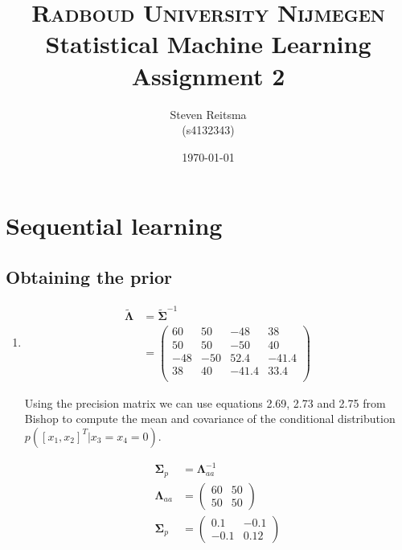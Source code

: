 \documentclass[paper=a4, fontsize=10pt]{scrartcl} %
\title{	
\normalfont \normalsize 
\textsc{Radboud University Nijmegen}  %
\horrule{0.5pt} \\[0.3cm] %
\huge Statistical Machine Learning \\ Assignment 2 \\ %
\horrule{2pt}  %
}
\author{Steven Reitsma \\ (s4132343)} %
\date{\normalsize\today} %
\numberwithin{equation}{section} %
\numberwithin{figure}{section} %
\numberwithin{table}{section} %
\begin{document}
\maketitle %

\section{Sequential learning}
\subsection{Obtaining the prior}
\begin{enumerate}
	\item 
		\begin{align}
			\boldsymbol{\tilde \Lambda} &= \boldsymbol{\tilde \Sigma}^{-1}\\
						   &= \begin{pmatrix}
								   60 &  50 & -48 &  38\\
								   50 &  50 & -50 &  40\\
								  -48 & -50 &  52.4 & -41.4\\
								   38 &  40 & -41.4 &  33.4\\
							  \end{pmatrix}
		\end{align}

		Using the precision matrix we can use equations 2.69, 2.73 and 2.75 from Bishop to compute the mean and covariance of the conditional distribution $p([x_1, x_2]^T \vert x_3 = x_4 = 0)$.

		\begin{align}
			\boldsymbol\Sigma_p &= \boldsymbol\Lambda_{aa}^{-1} \tag{according to 2.73}\\
			\boldsymbol\Lambda_{aa} &= \begin{pmatrix}
								60 & 50 \\
								50 & 50
							\end{pmatrix} \\
			\boldsymbol\Sigma_p &= \begin{pmatrix}
							0.1 & -0.1 \\
   							-0.1 &    0.12 \
   						\end{pmatrix}
		\end{align}


\end{enumerate}
\end{document}

